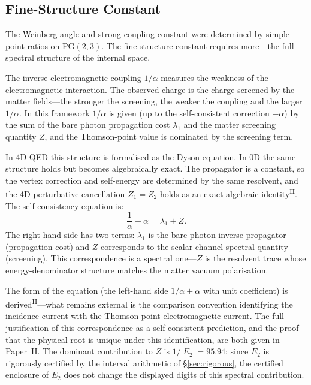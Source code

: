 \documentclass[12pt,a4paper]{article}
\newcommand{\PII}{\textsuperscript{\textup{II}}}
\begin{document}
\subsection{Fine-Structure Constant}\label{sec:alpha}

The Weinberg angle and strong coupling constant were determined
by simple point ratios on $\mathrm{PG}(2,3)$.
The fine-structure constant requires more---the full spectral
structure of the internal space.

The inverse electromagnetic coupling $1/\alpha$ measures the weakness of the electromagnetic interaction. The observed charge is the charge screened by the matter fields---the stronger the screening, the weaker the coupling and the larger $1/\alpha$. In this framework $1/\alpha$ is given (up to the self-consistent correction $-\alpha$) by the sum of the bare photon propagation cost $\lambda_1$ and the matter screening quantity $Z$, and the Thomson-point value is dominated by the screening term.

In 4D QED this structure is formalised as the Dyson equation.
In 0D the same structure holds but becomes algebraically
exact. The propagator is a constant, so the vertex correction
and self-energy are determined by the same resolvent, and the
4D perturbative cancellation $Z_1 = Z_2$ holds as an exact
algebraic identity\PII{}.
The self-consistency equation is:
\begin{equation}\label{eq:alpha_sc}
  \frac{1}{\alpha} + \alpha = \lambda_1 + Z.
\end{equation}
The right-hand side has two terms:
$\lambda_1$ is the bare photon inverse propagator
(propagation cost) and $Z$ corresponds to the scalar-channel spectral quantity (screening). This correspondence is a spectral one---$Z$ is the resolvent trace
whose energy-denominator structure matches the matter vacuum polarisation.

The form of the equation (the left-hand side $1/\alpha + \alpha$ with unit coefficient) is derived\PII{}---what remains external is the comparison convention identifying the incidence current with the Thomson-point electromagnetic current. The full justification of this correspondence as a self-consistent prediction, and the proof that the physical root is unique under this identification, are both given in Paper~II. The dominant contribution to $Z$ is $1/|E_2| = 95.94$; since $E_2$ is rigorously certified by the interval arithmetic of \S\ref{sec:rigorous}, the certified enclosure of $E_2$ does not change the displayed digits of this spectral contribution.
\end{document}
